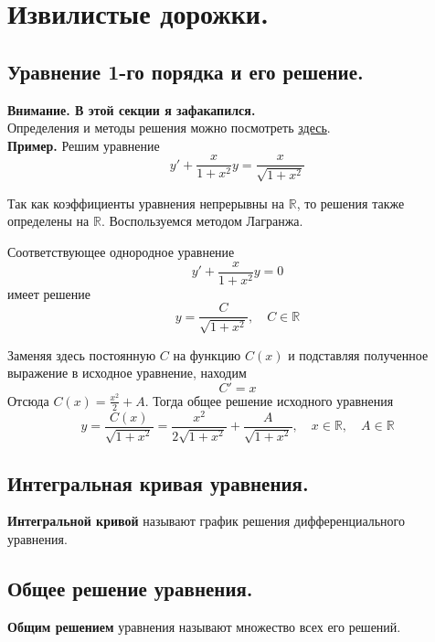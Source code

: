 \documentclass{article}
\begin{document}
\section{Извилистые дорожки.}

\subsection{Уравнение 1-го порядка и его решение.}
\textbf{Внимание. В этой секции я зафакапился.}\\
Определения и методы решения можно посмотреть \hyperref[bil2]{здесь}.\\

\noindent \textbf{Пример.} Решим уравнение
\begin{equation*}
    y' + \frac{x}{1+x^2}y = \frac{x}{\sqrt{1 + x^2}}
\end{equation*}

Так как коэффициенты уравнения непрерывны на $\mathbb{R}$, то решения также определены на $\mathbb{R}$. Воспользуемся методом Лагранжа.

Соответствующее однородное уравнение
\begin{equation*}
    y' + \frac{x}{1+x^2}y = 0
\end{equation*}
имеет решение
\begin{equation*}
    y = \frac{C}{\sqrt{1 + x^2}}, \quad C \in \mathbb{R}
\end{equation*}

Заменяя здесь постоянную $C$ на функцию $C(x)$ и подставляя полученное выражение в исходное уравнение, находим
\begin{equation*}
    C' = x
\end{equation*}
Отсюда $C(x) = \frac{x^2}{2} + A$. Тогда общее решение исходного уравнения
\begin{equation*}
    y = \frac{C(x)}{\sqrt{1 + x^2}} =  \frac{x^2}{2\sqrt{1 + x^2}} + \frac{A}{\sqrt{1 + x^2}}, \quad x \in \mathbb{R}, \quad A \in \mathbb{R}
\end{equation*}

\subsection{Интегральная кривая уравнения.}
\textbf{Интегральной кривой} называют график решения дифференциального уравнения.

\subsection{Общее решение уравнения.}
\textbf{Общим решением} уравнения называют множество всех его решений.
\end{document}
